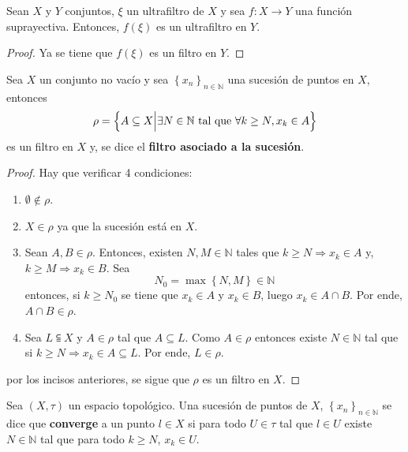 \documentclass[12pt]{report}
\theoremstyle{largebreak}
\newcommand\cf[3]{\ensuremath{#1:#2\rightarrow#3}}
\begin{document}
    \begin{excer}
        Sean $X$ y $Y$ conjuntos, $\xi$ un ultrafiltro de $X$ y sea $\cf{f}{X}{Y}$ una función suprayectiva. Entonces, $f(\xi)$ es un ultrafiltro en $Y$.
    \end{excer}

    \begin{proof}
        Ya se tiene que $f(\xi)$ es un filtro en $Y$. 
    \end{proof}

    \begin{exa}
        Sea $X$ un conjunto no vacío y sea $\left\{x_n \right\}_{n\in\mathbb{N}}$ una sucesión de puntos en $X$, entonces
        \begin{equation*}
            \rho=\left\{A\subseteq X\Big|\exists N\in\mathbb{N}\textup{ tal que }\forall k\geq N, x_{k}\in A \right\}
        \end{equation*}
        es un filtro en $X$ y, se dice el \textbf{filtro asociado a la sucesión}.
    \end{exa}

    \begin{proof}
        Hay que verificar 4 condiciones:
        \begin{enumerate}
            \item $\emptyset\notin\rho$.
            \item $X\in\rho$ ya que la sucesión está en $X$.
            \item Sean $A,B\in\rho$. Entonces, existen $N,M\in\mathbb{N}$ tales que $k\geq N\Rightarrow x_k\in A$ y, $k\geq M\Rightarrow x_k\in B$. Sea
            \begin{equation*}
                N_0=\max\left\{N,M \right\}\in\mathbb{N}
            \end{equation*}
            entonces, si $k\geq N_0$ se tiene que $x_k\in A$ y $x_k\in B$, luego $x_k\in A\cap B$. Por ende, $A\cap B\in \rho$.
            \item Sea $L\subseteqq X$ y $A\in\rho$ tal que $A\subseteq L$. Como $A\in\rho$ entonces existe $N\in\mathbb{N}$ tal que si $k\geq N\Rightarrow x_k\in A\subseteq L$. Por ende, $L\in\rho$.
        \end{enumerate}
        por los incisos anteriores, se sigue que $\rho$ es un filtro en $X$.
    \end{proof}

    \begin{mydef}
        Sea $(X,\tau)$ un espacio topológico. Una sucesión de puntos de $X$, $\left\{x_n \right\}_{ n\in\mathbb{N}}$ se dice que \textbf{converge} a un punto $l\in X$ si para todo $U\in\tau$ tal que $l\in U$ existe $N\in\mathbb{N}$ tal que para todo $k\geq N$, $x_k\in U$.
    \end{mydef}
\end{document}
